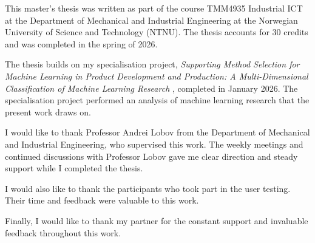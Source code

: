 \noindent This master's thesis was written as part of the course 
TMM4935 Industrial ICT at the Department of Mechanical and Industrial Engineering 
at the Norwegian University of Science and Technology (NTNU). 
The thesis accounts for 30 credits and was completed in the spring of 2026.

The thesis builds on my specialisation project, 
\textit{Supporting Method Selection for Machine Learning in Product Development and Production: A Multi-Dimensional Classification of Machine Learning Research} \parencite{bergsto2026mlselection}, 
completed in January 2026. 
The specialisation project performed an analysis of machine learning research that the present work draws on. 

I would like to thank Professor Andrei Lobov from the Department of Mechanical and Industrial Engineering, who supervised this work. 
The weekly meetings and continued discussions with Professor Lobov gave me clear direction and steady support while I completed the thesis.

I would also like to thank the participants who took part in the user testing. 
Their time and feedback were valuable to this work.

Finally, I would like to thank my partner for the constant support and 
invaluable feedback throughout this work.